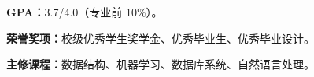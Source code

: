 \documentclass{simplecnresume}
\begin{document}
\begin{resumeitems}
  \item \textbf{GPA：}3.7/4.0（专业前 10\%）。
  \item \textbf{荣誉奖项：}校级优秀学生奖学金、优秀毕业生、优秀毕业设计。
  \item \textbf{主修课程：}数据结构、机器学习、数据库系统、自然语言处理。
\end{resumeitems}

\begin{resumeawards}
\end{resumeawards}
\end{document}
